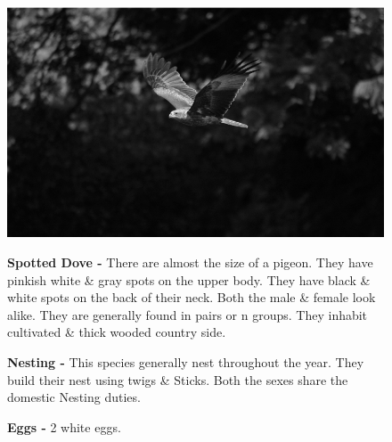 \begin{figure}[H]
\begin{center}
\includegraphics{figure/Land_birds/01_pariah_kite/pariah-kite.eps}
\end{center}
\medskip
\noindent
{\bf Spotted Dove -} There are almost the size of a pigeon. They have pinkish white \& gray spots on the upper body. They have black \& white spots on the back of their neck. Both the male \& female look alike. They are generally found in pairs or n groups. They inhabit cultivated \& thick wooded country side. 


\medskip
{\bf Nesting -} This species generally nest throughout the year. They build their nest using twigs \& Sticks. Both the sexes share the domestic Nesting duties.

{\bf Eggs -} 2 white eggs.
\end{figure}

\vfill\eject

~\phantom{a}
\vfill

